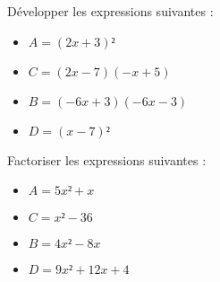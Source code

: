 \documentclass[
	classe=$1^{ere}STI2D$,
	headerTitle=Interrogation
]{évaluation}
\begin{document}
\begin{exercice}
	Développer les expressions suivantes :
	\begin{multicols}{2}
		\begin{itemize}
			\item $A = (2x + 3)²$\vspace{\spacing}


			\item $C = (2x - 7)(-x + 5)$\vspace{\spacing}


			\item $B = (-6x + 3)(-6x - 3)$\vspace{\spacing}


			\item $D = (x - 7)²$\vspace{\spacing}


		\end{itemize}
	\end{multicols}
\end{exercice}

\begin{exercice}
	Factoriser les expressions suivantes :
	\begin{multicols}{2}
		\begin{itemize}
			\item $A = 5x² + x$\vspace{\spacing}

			\item $C = x² - 36$\vspace{\spacing}

			\item $B = 4x² - 8x$\vspace{\spacing}

			\item $D = 9x² + 12x + 4$\vspace{\spacing}

		\end{itemize}
	\end{multicols}
\end{exercice}
\end{document}
